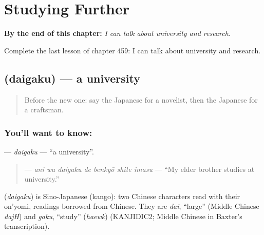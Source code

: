 
\chapter{Studying Further}
\label{ch:ja-studying-further}

\begin{chapteropening}
\textbf{By the end of this chapter:} \emph{I can talk about university and research.}

Complete the last lesson of chapter 459: I can talk about university and research.
\end{chapteropening}

\section[\texorpdfstring{\ja{だいがく} (daigaku)}{だいがく (daigaku)}]{ (daigaku) — a university}

\label{lesson:JA-C459-daigaku}



\begin{quote}
Before the new one: say the Japanese for a novelist, then the Japanese for a craftsman.
\end{quote}

\subsection*{You'll want to know: }
\textbf{} — \emph{daigaku} — \textquotedblleft{}a university\textquotedblright{}.

\begin{quote}
\textbf{  } — \emph{ani wa daigaku de benkyō shite imasu} — \textquotedblleft{}My elder brother studies at university.\textquotedblright{}
\end{quote}

\begin{cousinweb}
\textbf{} (\emph{daigaku}) is Sino-Japanese (kango): two Chinese characters read with their on'yomi, readings borrowed from Chinese. They are \emph{dai}, \textquotedblleft{}large\textquotedblright{} (Middle Chinese \emph{dajH}) and \emph{gaku}, \textquotedblleft{}study\textquotedblright{} (\emph{haewk}) (KANJIDIC2; Middle Chinese in Baxter's transcription).
\end{cousinweb}

